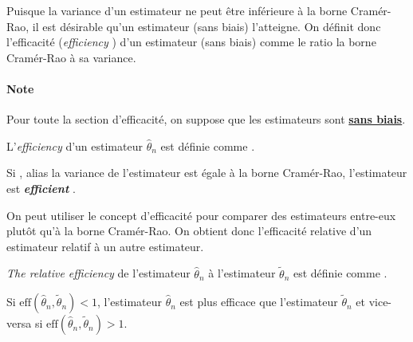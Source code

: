 \documentclass[french]{article}
\begin{document}
\begin{multicols*}{2}
\begin{rappel_enhanced}[Motivation]
Puisque la variance d'un estimateur ne peut être inférieure à la borne Cramér-Rao, il est désirable qu'un estimateur (sans biais) l'atteigne. On définit donc l'efficacité (\og \textit{efficiency} \fg{}) d'un estimateur (sans biais) comme le ratio la borne Cramér-Rao à sa variance.
\end{rappel_enhanced}

\paragraph{Note}	Pour toute la section d'efficacité, on suppose que les estimateurs sont \underline{\textbf{sans biais}}.

\begin{definitionNOHFILL}
L'\og \textit{efficiency} \fg{} d'un estimateur $\hat{\theta}_{n}$ est définie comme .

\begin{definitionNOHFILLsub}
Si , alias la variance de l'estimateur est égale à la borne Cramér-Rao, l'estimateur est \textbf{\og \textit{efficient} \fg{}}.
\end{definitionNOHFILLsub}
\end{definitionNOHFILL}


\begin{rappel_enhanced}[Motivation]
On peut utiliser le concept d'efficacité pour comparer des estimateurs entre-eux plutôt qu'à la borne Cramér-Rao. On obtient donc l'efficacité relative d'un estimateur relatif à un autre estimateur.
\end{rappel_enhanced}

\begin{definitionNOHFILL}
\og \textit{The relative efficiency} \fg{} de l'estimateur $\hat\theta_{n}$ à l'estimateur $\tilde\theta_{n}$ est définie comme .

\bigskip

Si $\text{eff}(\hat\theta_{n}, \tilde\theta_{n}) < 1$, l'estimateur $\hat{\theta}_{n}$ est plus efficace que l'estimateur $\tilde{\theta}_{n}$ et vice-versa si $\text{eff}(\hat\theta_{n}, \tilde\theta_{n}) > 1$.
\end{definitionNOHFILL}




\end{multicols*}
\end{document}
